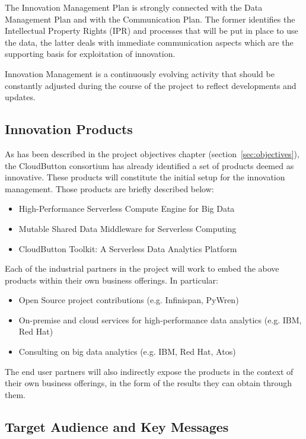 \documentclass[a4paper,11pt]{article}
\begin{document}
The Innovation Management Plan is strongly connected with the Data Management Plan and with the Communication Plan. The former identifies the Intellectual Property Rights (IPR) and processes that will be put in place to use the data, the latter deals with immediate communication aspects which are the supporting basis for exploitation of innovation.

Innovation Management is a continuously evolving activity that should be constantly adjusted during the course of the project to reflect developments and updates.

\subsection{Innovation Products}

As has been described in the project objectives chapter (section~\ref{sec:objectives}), the CloudButton consortium has already identified a set of products deemed as innovative. 
These products will 
constitute the initial setup for the innovation management. Those products are briefly described below:

\begin{itemize}
\item High-Performance Serverless Compute Engine for Big Data
\item Mutable Shared Data Middleware for Serverless Computing
\item CloudButton Toolkit: A Serverless Data Analytics Platform
\end{itemize}

Each of the industrial partners in the project will work to embed the above products within their own business offerings. In particular:

\begin{itemize}
\item Open Source project contributions (e.g. Infinispan, PyWren)
\item On-premise and cloud services for high-performance data analytics (e.g. IBM, Red Hat)
\item Consulting on big data analytics (e.g. IBM, Red Hat, Atos)
\end{itemize}

The end user partners will also indirectly expose the products in the context of their own business offerings, in the form of the results they can obtain through them.

\subsection{Target Audience and Key Messages}
\end{document}
